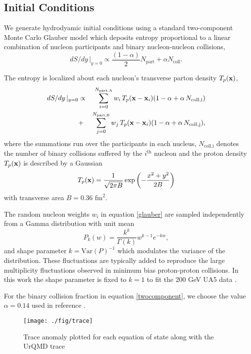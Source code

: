 \documentclass[aps,prc,reprint,amsmath,nofootinbib,superscriptaddress]{revtex4-1}
\begin{document}
\subsection{Initial Conditions}

We generate hydrodyamic initial conditions using a standard two-component Monte Carlo Glauber model which deposits entropy proportional to a linear combination of nucleon participants and binary nucleon-nucleon collisions,
\begin{equation}
 dS/dy \,\vert_{y=0} \propto \frac{(1-\alpha)}{2}N_\text{part} + \alpha N_\text{coll}.
 \label{twocomponent}
\end{equation}

The entropy is localized about each nucleon's transverse parton density $T_p({\bf x})$,
\begin{eqnarray}
 dS/dy \,\vert_{y=0} &\propto& \sum\limits_{i=0}^{N_\text{part,A}} w_i\, T_p({\bf x} - {\bf x}_i)(1-\alpha + \alpha\, N_\text{coll,i}) \nonumber \\
                     &+& \sum\limits_{j=0}^{N_\text{part,B}} w_j\, T_p({\bf x} - {\bf x}_i)(1-\alpha + \alpha\, N_\text{coll,j}),
 \label{glauber}
\end{eqnarray}
where the summations run over the participants in each nucleus, $N_\text{coll,i}$ denotes the number of binary collisions suffered by the $i^\text{th}$ nucleon and the proton density $T_p({\bf x})$ is described by a Gaussian
\begin{equation}
 T_p({\bf x}) = \frac{1}{\sqrt{2 \pi B}} \exp \left(-\frac{x^2+y^2}{2 B} \right)
\end{equation}
with transverse area $B = 0.36$ $\text{fm}^2$.

The random nucleon weights $w_i$ in equation \eqref{glauber} are sampled independently from a Gamma distribution with unit mean
\begin{equation}
 P_k(w) = \frac{k^k}{\Gamma(k)} w^{k-1} e^{-k w},
\end{equation}
and shape parameter $k = \text{Var}(P)^{-1}$ which modulates the variance of the distribution. 
These fluctuations are typically added \cite{?} to reproduce the large multiplicity fluctuations observed in minimum bias proton-proton collisions. 
In this work the shape parameter is fixed to $k=1$ to fit the $200$ GeV UA5 data \cite{?}. 

For the binary collision fraction in equation \eqref{twocomponent}, we choose the value $\alpha=0.14$ used in reference \cite{?}.
\begin{figure}[t]
  \texttt{[image: ./fig/trace]}
  \caption{\label{fig:trace} Trace anomaly plotted for each equation of state along with the UrQMD trace}
\end{figure}
\end{document}
